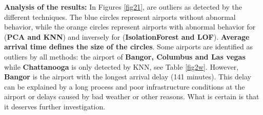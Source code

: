 \noindent\textbf{Analysis of the results:} 
In Figures \ref{fig21}, are outliers as detected by the different techniques. The blue circles represent airports without abnormal behavior, while the orange circles represent airports with abnormal behavior for (\textbf{PCA and KNN}) and inversely for (\textbf{IsolationForest and LOF}). \textbf{Average arrival time defines the size of the circles}. Some airports are identified as outliers by all methods: the airport of \textbf{Bangor, Columbus and Las vegas} while \textbf{Chattanooga} is only detected by KNN, see Table \ref{fig2w}. However, \textbf{Bangor} is the airport with the longest arrival delay (141 minutes). This delay can be explained by a long process and poor infrastructure conditions at the airport or delays caused by bad weather or other reasons. What is certain is that it deserves further investigation.

\afterpage{\FloatBarrier}


